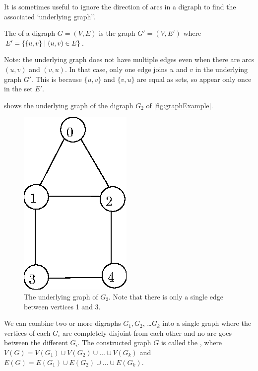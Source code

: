 It is sometimes useful to ignore the direction of arcs in a digraph to find the associated `underlying graph''.

\begin{Definition}
The  of a digraph $G = (V, E)$ is the graph 
$G' = (V, E')$ where $E' = \mbox{$\{\{u, v\} \mid (u, v)\in E\}$}$.
\end{Definition}


Note: the underlying graph does not have multiple
edges even when there are arcs $(u, v)$ and $(v, u)$. In that case,  only
one edge joins $u$ and $v$ in the underlying graph $G'$.  This is because $\{u, v\}$ and
$\{v, u\}$ are equal as sets, so appear only once in the set $E'$.

\begin{Example}
 shows the underlying graph of the digraph 
$G_2$ of \cref{fig:graphExample}.
\end{Example}

\begin{figure}
\begin{center}
\includegraphics{figs/wUnderly.eps}
\end{center}
\caption{The underlying graph of $G_2$. Note that there is only a single edge between vertices 1 and 3.}
\label{fig:underly}
\end{figure}

\begin{Definition} 
We can combine two or more digraphs $G_1, G_2$, \ldots $G_k$ into a
single graph where the vertices of each $G_i$ are completely disjoint from
each other and no arc goes between the different $G_i$. The constructed
graph $G$ is called the , where $V(G) = V(G_1) \cup
V(G_2) \cup \ldots \cup V(G_k)$ and $E(G) = E(G_1) \cup E(G_2) \cup \ldots
\cup E(G_k)$.
\end{Definition}









